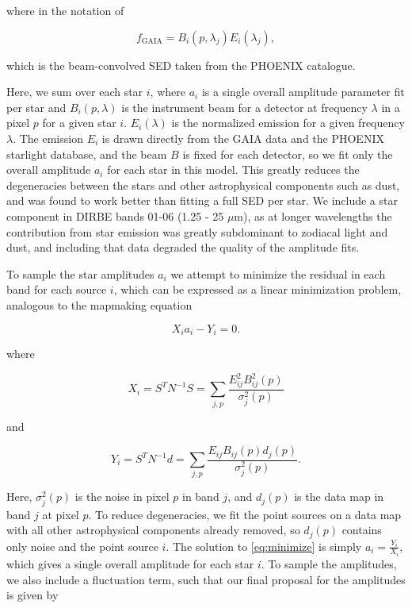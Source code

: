 \documentclass{aa}
\begin{document}
where in the notation of \cite{CG02_01} 

\begin{equation}
f_{\mathrm{GAIA}} = B_i(p, \lambda_j) E_i(\lambda_j),
\end{equation}

which is the beam-convolved SED taken from the PHOENIX catalogue.

Here, we sum over each star $i$, where $a_i$ is a single overall amplitude parameter fit per star and $B_i(p, \lambda)$ is the instrument beam for a detector at frequency $\lambda$ in a pixel $p$ for a given star $i$. $E_i(\lambda)$ is the normalized emission for a given frequency $\lambda$. The emission $E_i$ is drawn directly from the GAIA data and the PHOENIX starlight database, and the beam $B$ is fixed for each detector, so we fit only the overall amplitude $a_i$ for each star in this model. This greatly reduces the degeneracies between the stars and other astrophysical components such as dust, and was found to work better than fitting a full SED per star. We include a star component in DIRBE bands 01-06 (1.25 - 25 $\mu$m), as at longer wavelengths the contribution from star emission was greatly subdominant to zodiacal light and dust, and including that data degraded the quality of the amplitude fits. 

To sample the star amplitudes $a_i$ we attempt to minimize the residual in each band for each source $i$, which can be expressed as a linear minimization problem, analogous to the mapmaking equation

\begin{equation}
\label{eq:minimize}
X_ia_i - Y_i = 0.
\end{equation}

where

\begin{equation}
X_i = S^T N^{-1} S = \sum_{j,p}\frac{E_{ij}^2 B^2_{ij}(p)}{\sigma_j^2(p)} 
\end{equation}

and

\begin{equation}
Y_i = S^TN^{-1}d = \sum_{j,p} \frac{E_{ij}B_{ij}(p) d_j(p)}{\sigma_j^2(p)}.
\end{equation}

Here, $\sigma_j^2(p)$ is the noise in pixel $p$ in band $j$, and $d_j(p)$ is the data map in band $j$ at pixel $p$. To reduce degeneracies, we fit the point sources on a data map with all other astrophysical components already removed, so $d_j(p)$ contains only noise and the point source $i$. The solution to \ref{eq:minimize} is simply $a_i = \frac{Y_i}{X_i}$, which gives a single overall amplitude for each star $i$. To sample the amplitudes, we also include a fluctuation term, such that our final proposal for the amplitudes is given by
\end{document}
